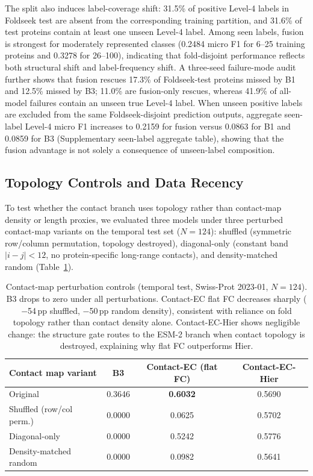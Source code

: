 \documentclass[numbered,contemporary,mediumone]{oup-authoring-template}
\begin{document}
The split also induces label-coverage shift: 31.5\% of positive Level-4 labels
in Foldseek test are absent from the corresponding training partition, and
31.6\% of test proteins contain at least one unseen Level-4 label. Among seen
labels, fusion is strongest for moderately represented classes (0.2484 micro F1
for 6--25 training proteins and 0.3278 for 26--100), indicating that
fold-disjoint performance reflects both structural shift and label-frequency
shift. A three-seed failure-mode audit further shows that fusion rescues 17.3\%
of Foldseek-test proteins missed by B1 and 12.5\% missed by B3; 11.0\% are
fusion-only rescues, whereas 41.9\% of all-model failures contain an unseen true
Level-4 label. When unseen positive labels are excluded from the same
Foldseek-disjoint prediction outputs, aggregate seen-label Level-4 micro F1
increases to 0.2159 for fusion versus 0.0863 for B1 and 0.0859 for B3
(Supplementary seen-label aggregate table), showing that the fusion advantage is not solely a
consequence of unseen-label composition.

\subsection{Topology Controls and Data Recency}

To test whether the contact branch uses topology rather than contact-map density or
length proxies, we evaluated three models under three perturbed contact-map variants on the
temporal test set ($N=124$): shuffled (symmetric row/column permutation, topology
destroyed), diagonal-only (constant band $|i-j|<12$, no protein-specific
long-range contacts), and density-matched random
(Table~\ref{tab:perturb}).

\begin{table}[!htbp]
\centering
\caption{Contact-map perturbation controls (temporal test, Swiss-Prot 2023-01,
$N=124$). B3 drops to zero under all perturbations.
Contact-EC flat FC decreases sharply ($-$54\,pp shuffled, $-$50\,pp random density),
consistent with reliance on fold topology rather than contact density alone.
Contact-EC-Hier shows negligible change: the structure gate routes to the ESM-2
branch when contact topology is destroyed, explaining why flat FC outperforms Hier.}
\label{tab:perturb}
\setlength{\tabcolsep}{5pt}
\begin{tabular}{lccc}
\toprule
Contact map variant & B3 & Contact-EC (flat FC) & Contact-EC-Hier \\
\midrule
Original                & 0.3646 & \textbf{0.6032} & 0.5690 \\
Shuffled (row/col perm.)& 0.0000 & 0.0625           & 0.5702 \\
Diagonal-only           & 0.0000 & 0.5242           & 0.5776 \\
Density-matched random  & 0.0000 & 0.0982           & 0.5641 \\
\bottomrule
\end{tabular}
\end{table}
\end{document}
